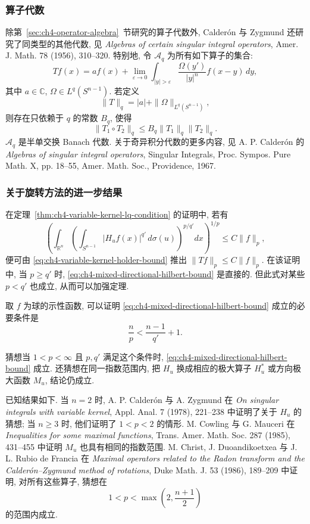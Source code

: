 \subsubsection{算子代数}
\label{subsec:ch4-operator-algebras}

除第~\ref{sec:ch4-operator-algebra}~节研究的算子代数外, Calderón 与 Zygmund 还研究了同类型的其他代数, 见 \emph{Algebras of certain singular integral operators}, Amer. J. Math. 78 (1956), 310--320. 特别地, 令 $\mathcal A_q$ 为所有如下算子的集合:
\[
 Tf(x)=af(x)+\lim_{\varepsilon\to0}\int_{|y|>\varepsilon}
 \frac{\Omega(y')}{|y|^n}f(x-y)\,dy,
\]
其中 $a\in\mathbb C$, $\Omega\in L^q(S^{n-1})$. 若定义
\[
 \|T\|_q=|a|+\|\Omega\|_{L^q(S^{n-1})},
\]
则存在只依赖于 $q$ 的常数 $B_q$, 使得
\[
 \|T_1\circ T_2\|_q\le B_q\|T_1\|_q\|T_2\|_q.
\]
$\mathcal A_q$ 是半单交换 Banach 代数. 关于奇异积分代数的更多内容, 见 A. P. Calderón 的 \emph{Algebras of singular integral operators}, Singular Integrals, Proc. Sympos. Pure Math. X, pp. 18--55, Amer. Math. Soc., Providence, 1967.

\subsubsection{关于旋转方法的进一步结果}
\label{subsec:ch4-more-rotations}

在定理~\ref{thm:ch4-variable-kernel-lq-condition} 的证明中, 若有
\begin{equation}
\label{eq:ch4-mixed-directional-hilbert-bound}
 \left(\int_{\mathbb R^n}
 \left(\int_{S^{n-1}}|H_uf(x)|^{q'}\,d\sigma(u)\right)^{p/q'}dx
 \right)^{1/p}
 \le C\|f\|_p,
\end{equation}
便可由 \eqref{eq:ch4-variable-kernel-holder-bound} 推出 $\|Tf\|_p\le C\|f\|_p$. 在该证明中, 当 $p\ge q'$ 时, \eqref{eq:ch4-mixed-directional-hilbert-bound} 是直接的. 但此式对某些 $p<q'$ 也成立, 从而可以加强定理.

取 $f$ 为球的示性函数, 可以证明 \eqref{eq:ch4-mixed-directional-hilbert-bound} 成立的必要条件是
\[
 \frac np<\frac{n-1}{q'}+1.
\]

\hypertarget{chapter-04-page-099}{}
猜想当 $1<p<\infty$ 且 $p,q'$ 满足这个条件时, \eqref{eq:ch4-mixed-directional-hilbert-bound} 成立. 还猜想在同一指数范围内, 把 $H_u$ 换成相应的极大算子 $H_u^*$ 或方向极大函数 $M_u$, 结论仍成立.

已知结果如下. 当 $n=2$ 时, A. P. Calderón 与 A. Zygmund 在 \emph{On singular integrals with variable kernel}, Appl. Anal. 7 (1978), 221--238 中证明了关于 $H_u$ 的猜想; 当 $n\ge3$ 时, 他们证明了 $1<p<2$ 的情形. M. Cowling 与 G. Mauceri 在 \emph{Inequalities for some maximal functions}, Trans. Amer. Math. Soc. 287 (1985), 431--455 中证明 $M_u$ 也具有相同的指数范围. M. Christ, J. Duoandikoetxea 与 J. L. Rubio de Francia 在 \emph{Maximal operators related to the Radon transform and the Calderón--Zygmund method of rotations}, Duke Math. J. 53 (1986), 189--209 中证明, 对所有这些算子, 猜想在
\[
 1<p<\max\left(2,\frac{n+1}{2}\right)
\]
的范围内成立.

